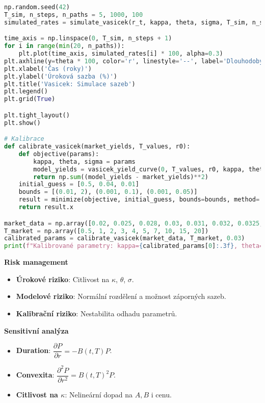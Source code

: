 \begin{example}
\begin{lstlisting}[language=Python, caption={Implementace Vasicekova modelu v Pythonu}]
np.random.seed(42)
T_sim, n_steps, n_paths = 5, 1000, 100
simulated_rates = simulate_vasicek(r_t, kappa, theta, sigma, T_sim, n_steps, n_paths)

time_axis = np.linspace(0, T_sim, n_steps + 1)
for i in range(min(20, n_paths)):
    plt.plot(time_axis, simulated_rates[i] * 100, alpha=0.3)
plt.axhline(y=theta * 100, color='r', linestyle='--', label='Dlouhodobý průměr')
plt.xlabel('Čas (roky)')
plt.ylabel('Úroková sazba (%)')
plt.title('Vasicek: Simulace sazeb')
plt.legend()
plt.grid(True)

plt.tight_layout()
plt.show()

# Kalibrace
def calibrate_vasicek(market_yields, T_values, r0):
    def objective(params):
        kappa, theta, sigma = params
        model_yields = vasicek_yield_curve(0, T_values, r0, kappa, theta, sigma)
        return np.sum((model_yields - market_yields)**2)
    initial_guess = [0.5, 0.04, 0.01]
    bounds = [(0.01, 2), (0.001, 0.1), (0.001, 0.05)]
    result = minimize(objective, initial_guess, bounds=bounds, method='L-BFGS-B')
    return result.x

market_data = np.array([0.02, 0.025, 0.028, 0.03, 0.031, 0.032, 0.0325, 0.033, 0.0335, 0.034])
T_market = np.array([0.5, 1, 2, 3, 4, 5, 7, 10, 15, 20])
calibrated_params = calibrate_vasicek(market_data, T_market, 0.03)
print(f"Kalibrované parametry: kappa={calibrated_params[0]:.3f}, theta={calibrated_params[1]:.3f}, sigma={calibrated_params[2]:.3f}")
\end{lstlisting}

\noindent\textbf{Risk management}
\begin{itemize}
\item \textbf{Úrokové riziko}: Citlivost na $\kappa$, $\theta$, $\sigma$.
\item \textbf{Modelové riziko}: Normální rozdělení a možnost záporných sazeb.
\item \textbf{Kalibrační riziko}: Nestabilita odhadu parametrů.
\end{itemize}

\noindent\textbf{Sensitivní analýza}
\begin{itemize}
\item \textbf{Duration}: $\dfrac{\partial P}{\partial r} = -B(t,T)P$.
\item \textbf{Convexita}: $\dfrac{\partial^2 P}{\partial r^2} = B(t,T)^2 P$.
\item \textbf{Citlivost na $\kappa$}: Nelineární dopad na $A,B$ i cenu.
\end{itemize}
\end{example}

